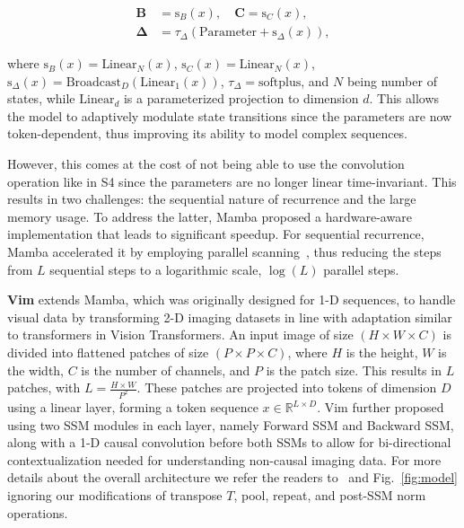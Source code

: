 \begin{equation}
\begin{aligned}
\mathbf{B} &= \text{s}_{B}(x), \quad \mathbf{C} = \text{s}_{C}(x), \\
\mathbf{\Delta} &= \tau_\Delta(\text{Parameter} + \text{s}_{\Delta}(x)),
\end{aligned}
\end{equation}


where $\text{s}_{B}(x) = \text{Linear}_{N}(x)$, $\text{s}_{C}(x) = \text{Linear}_{N}(x)$, $\text{s}_{\Delta}(x) = \text{Broadcast}_{D}(\text{Linear}_1(x))$, $\tau_\Delta = \text{softplus}$, and $N$ being number of states, while $\text{Linear}_{d}$ is a parameterized projection to dimension $d$. This allows the model to adaptively modulate state transitions since the parameters are now token-dependent, thus improving its ability to model complex sequences. 

However, this comes at the cost of not being able to use the convolution operation like in S4 since the parameters are no longer linear time-invariant. This results in two challenges: the sequential nature of recurrence and the large memory usage. To address the latter, Mamba proposed a hardware-aware implementation that leads to significant speedup. For sequential recurrence, Mamba accelerated it by employing parallel scanning~\cite{smith2022simplified}, thus reducing the steps from $L$ sequential steps to a logarithmic scale, $\log(L)$ parallel steps.

\textbf{Vim} extends Mamba, which was originally designed for 1-D sequences, to handle visual data by transforming 2-D imaging datasets in line with adaptation similar to transformers in Vision Transformers. An input image of size $(H \times W \times C)$ is divided into flattened patches of size $(P \times P \times C)$, where $H$ is the height, $W$ is the width, $C$ is the number of channels, and $P$ is the patch size. This results in $L$ patches, with $L = \frac{H \times W}{P^2}$. These patches are projected into tokens of dimension $D$ using a linear layer, forming a token sequence $x \in \mathbb{R}^{L \times D}$.
Vim further proposed using two SSM modules in each layer, namely Forward SSM and Backward SSM, along with a 1-D causal convolution before both SSMs to allow for bi-directional contextualization needed for understanding non-causal imaging data. For more details about the overall architecture we refer the readers to~\cite{vim} and Fig.~\ref{fig:model} ignoring our modifications of transpose $T$, pool, repeat, and post-SSM norm operations.
